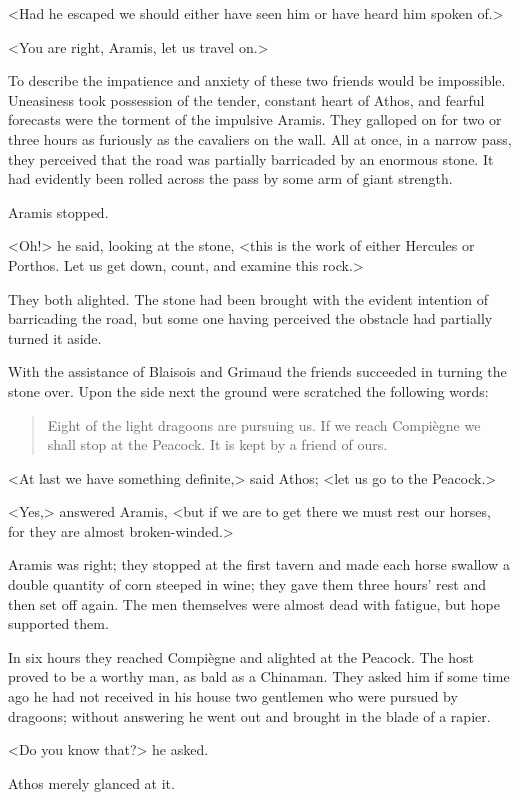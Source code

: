 <Had he escaped we should either have seen him or have heard him spoken of.>

<You are right, Aramis, let us travel on.>

To describe the impatience and anxiety of these two friends would be impossible. Uneasiness took possession of the tender, constant heart of Athos, and fearful forecasts were the torment of the impulsive Aramis. They galloped on for two or three hours as furiously as the cavaliers on the wall. All at once, in a narrow pass, they perceived that the road was partially barricaded by an enormous stone. It had evidently been rolled across the pass by some arm of giant strength.

Aramis stopped.

<Oh!> he said, looking at the stone, <this is the work of either Hercules or Porthos. Let us get down, count, and examine this rock.>

They both alighted. The stone had been brought with the evident intention of barricading the road, but some one having perceived the obstacle had partially turned it aside.

With the assistance of Blaisois and Grimaud the friends succeeded in turning the stone over. Upon the side next the ground were scratched the following words:  
\begin{quote}
Eight of the light dragoons are pursuing us. If we reach Compiègne we shall stop at the Peacock. It is kept by a friend of ours.
\end{quote}

<At last we have something definite,> said Athos; <let us go to the Peacock.>

<Yes,> answered Aramis, <but if we are to get there we must rest our horses, for they are almost broken-winded.>

Aramis was right; they stopped at the first tavern and made each horse swallow a double quantity of corn steeped in wine; they gave them three hours' rest and then set off again. The men themselves were almost dead with fatigue, but hope supported them.

In six hours they reached Compiègne and alighted at the Peacock. The host proved to be a worthy man, as bald as a Chinaman. They asked him if some time ago he had not received in his house two gentlemen who were pursued by dragoons; without answering he went out and brought in the blade of a rapier.

<Do you know that?> he asked.

Athos merely glanced at it.

